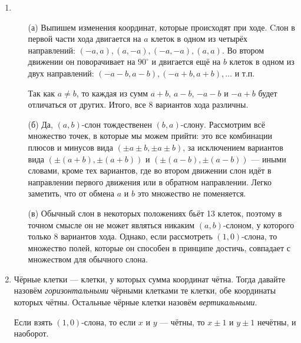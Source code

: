 
\begin{enumerate}

\item \begin{itemize}
\item[(а)] Выпишем изменения координат, которые происходят при ходе. 
Cлон в первой части хода двигается на $a$ клеток 
в одном из четырёх направлений: $(-a,a), (a,-a), (-a,-a), (a,a)$. Во втором 
движении он поворачивает на $90^\circ$ и двигается ещё на $b$ клеток в одном
из двух направлений: $(-a-b,a-b), (-a+b,a+b), \ldots$ и т.п.

Так как $a\ne b$, то каждая из сумм $a+b$, $a-b$, $-a-b$ и $-a+b$ будет отличаться
от других. Итого, все 8 вариантов хода различны.

\item[(б)] Да, $(a,b)$-слон тождественен $(b,a)$-слону. Рассмотрим всё множество точек,
в которые мы можем прийти: это все комбинации плюсов и минусов вида
$(\pm a \pm b, \pm a \pm b)$, за исключением
вариантов вида $(\pm (a+b), \pm (a+b))$ и $(\pm (a-b), \pm (a-b))$
--- иными словами, кроме тех вариантов, где во втором движении слон идёт в направлении
первого движения или в обратном направлении. Легко заметить, что от обмена
$a$ и $b$ это множество не поменяется.

\item[(в)] Обычный слон в некоторых положениях бьёт 13 клеток, поэтому в точном смысле он
не может являться никаким $(a,b)$-слоном, у которого только 8 вариантов хода. Однако,
если рассмотреть $(1,0)$-слона, то множество полей, которые он способен в принципе достичь,
совпадает с множеством для обычного слона.
\end{itemize}

\item Чёрные клетки --- клетки, у которых сумма координат чётна. Тогда давайте
назовём \emph{горизонтальными} чёрными клетками те клетки, обе координаты которых чётны. 
Остальные чёрные клетки назовём \emph{вертикальными}. 

Если взять $(1,0)$-слона, то если $x$ и $y$ --- чётны, то $x \pm 1$ и $y \pm 1$ нечётны,
и наоборот.

\begin{center}\end{center}


\end{enumerate}
